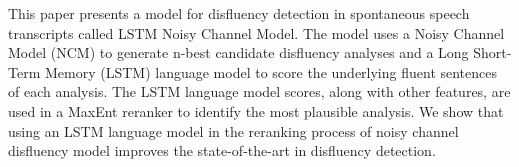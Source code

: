 This paper presents a model for disfluency detection in spontaneous speech transcripts called LSTM Noisy Channel Model. The model uses a Noisy Channel Model (NCM) to generate n-best candidate disfluency analyses and a Long Short-Term Memory (LSTM) language model to score the underlying fluent sentences of each analysis. The LSTM language model scores, along with other features, are used in a MaxEnt reranker to identify the most plausible analysis. We show that using an LSTM language model in the reranking process of noisy channel disfluency model improves the state-of-the-art in disfluency detection.
